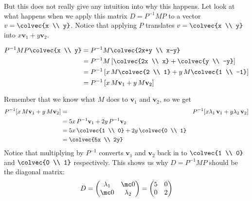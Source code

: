 {But this does not really give any intuition into why this happens. Let look at what happens when we apply this matrix $D = P^{-1}MP$ to a vector $v = \colvec{x \\ y}$. Notice that applying $P$ translates $v = \colvec{x \\ y}$ into $x\mathbf{v}_1+ y\mathbf{v}_2$.

\begin{align*}
P^{-1}MP
\colvec{x \\ y} &= P^{-1}M \colvec{2x+y \\ x-y} \\
&= P^{-1}M \left[\colvec{2x \\ x} + \colvec{y \\ -y}\right] \\
&= P^{-1}\left[ x\, M \colvec{2 \\ 1} + y\,  M\colvec{1 \\ -1}\right]\\
&= P^{-1}\left[ x\, M\mathbf{v}_1 + y\,   M\mathbf{v}_2\right]
\end{align*}

Remember that we know what $M$ does to $\mathbf{v}_1$ and $\mathbf{v}_2$, so we get
\begin{align*}
P^{-1}[ x\, M\mathbf{v}_1 + y\, M\mathbf{v}_2] &=& P^{-1}[ x \lambda_1\,  \mathbf{v}_1 + y \lambda_2 \,  \mathbf{v}_2] \\
&= 5x\,   P^{-1}\mathbf{v}_1 + 2y \,   P^{-1} \mathbf{v}_2 \\
&= 5x\,   \colvec{1 \\ 0} + 2y \,  \colvec{0 \\ 1} \\
&= \colvec{5x \\ 2y}
\end{align*}
Notice that multiplying by $P^{-1}$ converts $\mathbf{v}_1$ and $\mathbf{v}_2$ back in to $ \colvec{1 \\ 0}$ and $ \colvec{0 \\ 1}$ respectively. This shows us why $D = P^{-1}MP$ should be the diagonal matrix:
\[ D = \begin{pmatrix}
\lambda_1 &\mc0\\
\mc0 & \lambda_2
\end{pmatrix}
=\begin{pmatrix}
5 &0\\
0 & 2
\end{pmatrix}
\]
} %

